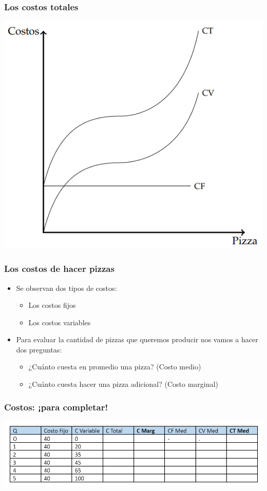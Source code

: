 \documentclass{beamer}
\begin{document}
\begin{frame}
\frametitle{Los costos totales}
\centering
\includegraphics[scale=0.6]{../Figures/C13.3.png}
\end{frame}

\begin{frame}
\frametitle{Los costos de hacer pizzas}
\begin{itemize}
    \item Se observan dos tipos de costos: 
        \begin{itemize}
        \item Los costos fijos
        \item Los costos variables
        \end{itemize}
    \vspace{2mm}
    \item Para evaluar la cantidad de pizzas que queremos producir nos vamos a hacer dos preguntas:
        \begin{itemize}
        \item ¿Cuánto cuesta en promedio una pizza? (Costo medio)
        \item ¿Cuánto cuesta hacer una pizza adicional? (Costo marginal)
        \end{itemize}
\end{itemize}
\end{frame}

\begin{frame}
\frametitle{Costos: ¡para completar! }
\centering
\includegraphics[scale=0.6]{../Figures/Cost1.png}
\end{frame}
\end{document}
